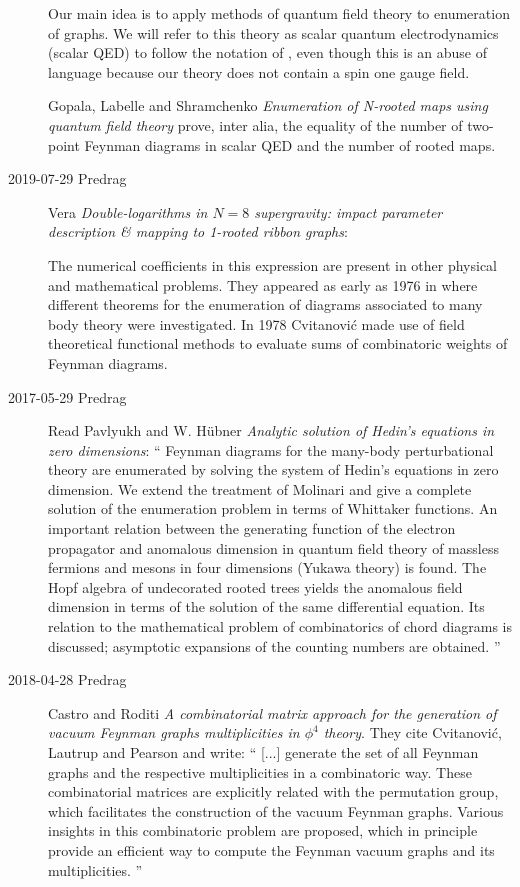 \begin{description}
Our main idea is to apply methods of quantum field theory to enumeration
of graphs. We will refer to this theory as scalar quantum electrodynamics
(scalar QED) to follow the notation of , even though
this is an abuse of language because our theory does not contain a spin
one gauge field.

Gopala, Labelle and Shramchenko {\em Enumeration of
{N}-rooted maps using quantum field theory} prove, inter alia, the
equality of the number of two-point Feynman diagrams in scalar
QED and the number of rooted maps.

\item[2019-07-29 Predrag]
Vera {\em Double-logarithms in {$N= 8$} supergravity: impact
parameter description {\&} mapping to 1-rooted ribbon graphs}:

The numerical coefficients in this expression are present in other
physical and mathematical problems.  They appeared as early as 1976 in
 where different theorems for the enumeration of diagrams
associated to many body theory were investigated.  In 1978 Cvitanovi\'c
\etal{} made use  of field  theoretical  functional  methods
to  evaluate  sums  of combinatoric weights of Feynman diagrams.

\item[2017-05-29 Predrag] Read
Pavlyukh and W. H{\"u}bner
{\em Analytic solution of {Hedin's} equations in zero dimensions}: ``
Feynman diagrams for the many-body perturbational theory are enumerated
by solving the system of Hedin's equations in zero dimension. We extend
the treatment of Molinari and give a
complete solution of the enumeration problem in terms of Whittaker
functions. An important relation between the generating function of the
electron propagator and anomalous dimension in quantum field theory of
massless fermions and mesons in four dimensions (Yukawa theory) is found.
The Hopf algebra of undecorated rooted trees yields the anomalous field
dimension in terms of the solution of the same differential equation. Its
relation to the mathematical problem of combinatorics of chord diagrams
is discussed; asymptotic expansions of the counting numbers are obtained.
''

\item[2018-04-28 Predrag]
Castro and Roditi {\em A combinatorial matrix approach for the
generation of vacuum {Feynman} graphs multiplicities in {$\phi^4$} theory}.
They cite Cvitanovi\'c, Lautrup and Pearson and write: ``
[...] generate the set of all Feynman graphs and the respective multiplicities in a
combinatoric way. These combinatorial matrices are explicitly
related with the permutation group, which facilitates the construction of the
vacuum Feynman graphs. Various insights in this combinatoric problem are
proposed, which in principle provide an efficient way to compute the Feynman
vacuum graphs and its multiplicities.
''


\end{description}
